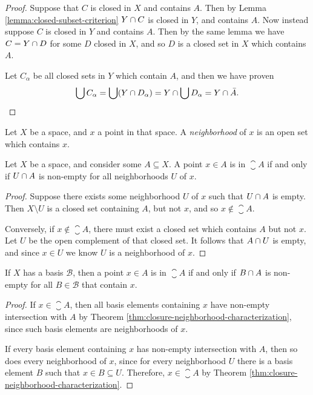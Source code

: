 \begin{proof}
    Suppose that $C$ is closed in $X$ and contains $A$. Then by Lemma \ref{lemma:closed-subset-criterion} $Y \cap C$ is closed in $Y$, and contains $A$. Now instead suppose $C$ is closed in $Y$ and contains $A$. Then by the same lemma we have $C = Y \cap D$ for some $D$ closed in $X$, and so $D$ is a closed set in $X$ which contains $A$.

    Let $C_{\alpha}$ be all closed sets in $Y$ which contain $A$, and then we have proven
    \begin{align*}
        \bigcup C_{\alpha} = \bigcup (Y \cap D_{\alpha}) = Y \cap \bigcup D_{\alpha} = Y \cap \bar{A}.
    \end{align*}
\end{proof}

\begin{defn}
    Let $X$ be a space, and $x$ a point in that space. A \emph{neighborhood} of $x$ is an open set which contains $x$.
\end{defn}

\begin{thm}\label{thm:closure-neighborhood-characterization}
    Let $X$ be a space, and consider some $A \subseteq X$. A point $x \in A$ is in $\closure{A}$ if and only if $U \cap A$ is non-empty for all neighborhoods $U$ of $x$.
\end{thm}

\begin{proof}
    Suppose there exists some neighborhood $U$ of $x$ such that $U \cap A$ is empty. Then $X \setminus U$ is a closed set containing $A$, but not $x$, and so $x \not\in \closure{A}$.

    Conversely, if $x \not\in \closure{A}$, there must exist a closed set which contains $A$ but not $x$. Let $U$ be the open complement of that closed set. It follows that $A \cap U$ is empty, and since $x \in U$ we know $U$ is a neighborhood of $x$.
\end{proof}

\begin{cor}
    If $X$ has a basis $\mathcal{B}$, then a point $x \in A$ is in $\closure{A}$ if and only if $B \cap A$ is non-empty for all $B \in \mathcal{B}$ that contain $x$.
\end{cor}

\begin{proof}
    If $x \in \closure{A}$, then all basis elements containing $x$ have non-empty intersection with $A$ by Theorem \ref{thm:closure-neighborhood-characterization}, since such basis elements are neighborhoods of $x$.

    If every basis element containing $x$ has non-empty intersection with $A$, then so does every neighborhood of $x$, since for every neighborhood $U$ there is a basis element $B$ such that $x \in B \subseteq U$. Therefore, $x \in \closure{A}$ by Theorem \ref{thm:closure-neighborhood-characterization}.
\end{proof}

